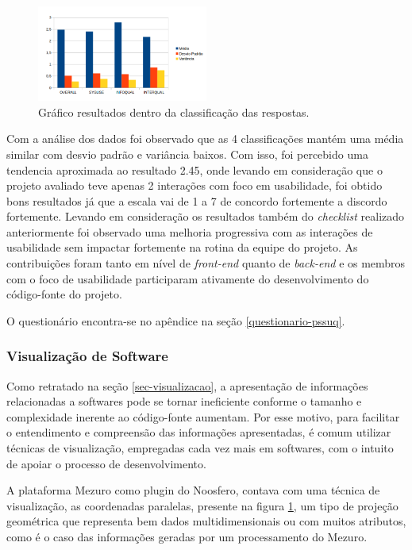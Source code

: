 \graphicspath{{figuras/}}
\begin{figure}[h]
\centering
\includegraphics[width=0.5\textwidth]{GraficoResultados}
\caption{Gráfico resultados dentro da classificação das respostas.}
\label{parallel-coordinate}
\end{figure}

Com a análise dos dados foi observado que as 4 classificações mantém uma média similar com desvio padrão e variância baixos. Com isso, foi percebido uma tendencia aproximada ao resultado 2.45, onde levando em consideração que o projeto avaliado teve apenas 2 interações com foco em usabilidade, foi obtido bons resultados já que a escala vai de 1 a 7 de concordo fortemente a discordo fortemente. Levando em consideração os resultados também do \textit{checklist} realizado anteriormente foi observado uma melhoria progressiva com as interações de usabilidade sem impactar fortemente na rotina da equipe do projeto. As contribuições foram tanto em nível de \textit{front-end} quanto de \textit{back-end} e os membros com o foco de usabilidade participaram ativamente do desenvolvimento do código-fonte do projeto. 

O questionário encontra-se no apêndice na seção \ref{questionario-pssuq}.

%
\subsubsection{Visualização de Software}
\label{visualizacao-software}

Como retratado na seção \ref{sec-visualizacao}, a apresentação de informações relacionadas a softwares pode se tornar ineficiente conforme o tamanho e complexidade inerente ao código-fonte aumentam. Por esse motivo, para facilitar o entendimento e compreensão das informações apresentadas, é comum utilizar técnicas de visualização, empregadas cada vez mais em softwares, com o intuito de apoiar o processo de desenvolvimento.

A plataforma Mezuro como plugin do Noosfero, contava com uma técnica de visualização, as coordenadas paralelas, presente na figura \ref{parallel-coordinate}, um tipo de projeção geométrica que representa bem dados multidimensionais ou com muitos atributos, como é o caso das informações geradas por um processamento do Mezuro.

